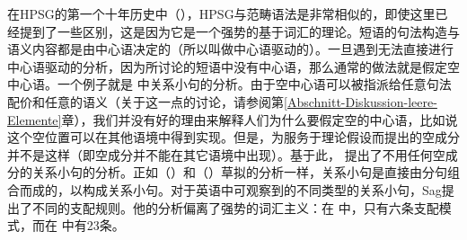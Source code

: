 在HPSG的第一个十年历史中（\citealp*{ps,ps2,NNP94a-ed-not-crossreferenced}），HPSG与范畴语法是非常相似的，即使这里已经提到了一些区别，这是因为它是一个强势的基于词汇的理论。短语的句法构造与语义内容都是由中心语决定的（所以叫做中心语驱动的）。一旦遇到无法直接进行中心语驱动的分析，因为所讨论的短语中没有中心语，那么通常的做法就是假定空中心语。一个例子就是 \citet[\S~5]{ps2}中关系小句的分析。由于空中心语可以被指派给任意句法配价和任意的语义（关于这一点的讨论，请参阅第\ref{Abschnitt-Diskussion-leere-Elemente}章），我们并没有好的理由来解释人们为什么要假定空的中心语，比如说这个空位置可以在其他语境中得到实现。但是，为服务于理论假设而提出的空成分并不是这样（即空成分并不能在其它语境中出现）。基于此， \citet{Sag97a}提出了不用任何空成分的关系小句的分析。正如（）和（）草拟的分析一样，关系小句是直接由分句组合而成的，以构成关系小句。对于英语中可观察到的不同类型的关系小句，Sag提出了不同的支配规则。他的分析偏离了强势的词汇主义：在 中，只有六条支配模式，而在 中有23条。

